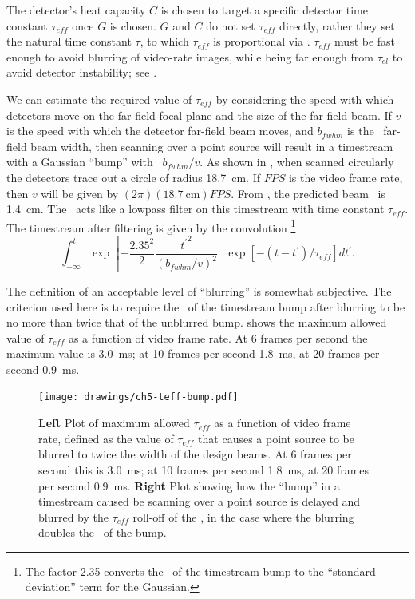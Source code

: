 The detector's heat capacity $C$ is chosen to target a specific detector time constant $\tau_{eff}$ once $G$ is chosen.
$G$ and $C$ do not set $\tau_{eff}$ directly, rather they set the natural time constant $\tau$, to which $\tau_{eff}$ is proportional via .
$\tau_{eff}$ must be fast enough to avoid blurring of video-rate images, while being far enough from $\tau_{el}$ to avoid detector instability; see .

We can estimate the required value of $\tau_{eff}$ by considering the speed with which detectors move on the far-field focal plane and the size of the far-field beam.
If $v$ is the speed with which the detector far-field beam moves, and $b_{fwhm}$ is the \FWHM\ far-field beam width, then scanning over a point source will result in a timestream with a Gaussian ``bump'' with \FWHM\ $b_{fwhm} / v$.
As shown in , when scanned circularly the detectors trace out a circle of radius \SI{18.7}{\cm}.
If $FPS$ is the video frame rate, then $v$ will be given by $(2 \pi)(\SI{18.7}{\cm}) FPS$.
From , the predicted beam \FWHM\ is \SI{1.4}{\cm}.
The \TES\ acts like a lowpass filter on this timestream with time constant $\tau_{eff}$.
The timestream after filtering is given by the convolution%
\footnote{The factor 2.35 converts the \FWHM\ of the timestream bump to the ``standard deviation'' term for the Gaussian.}
\begin{equation}
  \int_{-\infty}^{t} \exp{\left[-\frac{2.35^2}{2} \frac{{t^{\prime}}^2}{(b_{fwhm}/v)^2}\right]}
       \exp{\left[-(t-t^{\prime})/\tau_{eff}\right]} dt^{\prime}.
\end{equation}

The definition of an acceptable level of ``blurring'' is somewhat subjective.
The criterion used here is to require the \FWHM\ of the timestream bump after blurring to be no more than twice that of the unblurred bump.
 shows the maximum allowed value of $\tau_{eff}$ as a function of video frame rate.
At 6 frames per second the maximum value is \SI{3.0}{\ms}; at 10 frames per second \SI{1.8}{\ms}, at 20 frames per second \SI{0.9}{\ms}.

\begin{figure}
\centering
\texttt{[image: drawings/ch5-teff-bump.pdf]}
\caption[Maximum $\tau_{eff}$ for no blurring]{
  \textbf{Left} Plot of maximum allowed $\tau_{eff}$ as a function of video frame rate, defined as the value of $\tau_{eff}$ that causes a point source to be blurred to twice the width of the design beams.
  At 6 frames per second this is \SI{3.0}{\ms}; at 10 frames per second \SI{1.8}{\ms}, at 20 frames per second \SI{0.9}{\ms}.
  \textbf{Right} Plot showing how the ``bump'' in a timestream caused be scanning over a point source is delayed and blurred by the $\tau_{eff}$ roll-off of the \TES, in the case where the blurring doubles the \FWHM\ of the bump.
}
\label{fig:ch5-teff-bump}
\end{figure}

